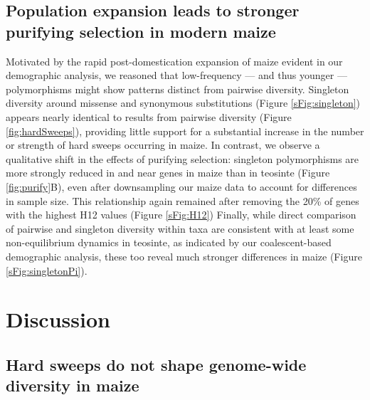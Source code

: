 \documentclass{pnastwo}
\begin{document}
\begin{article}
\subsection{Population expansion leads to stronger purifying selection in modern maize} %
Motivated by the rapid post-domestication expansion of maize evident in our demographic analysis, we reasoned that low-frequency --- and thus younger --- polymorphisms might show patterns distinct from pairwise diversity. 
Singleton diversity around missense and synonymous substitutions (Figure \ref{sFig:singleton}) appears nearly identical to results from pairwise diversity (Figure \ref{fig:hardSweeps}), providing little support for a substantial increase in the number or strength of hard sweeps occurring in maize. 
In contrast, we observe a qualitative shift in the effects of purifying selection: singleton polymorphisms are more strongly reduced in and near genes in maize than in teosinte (Figure \ref{fig:purify}B), even after downsampling our maize data to account for differences in sample size. This relationship again remained after removing the 20\% of genes with the highest H12 values (Figure \ref{sFig:H12})
Finally, while direct comparison of pairwise and singleton diversity within taxa are consistent with at least some non-equilibrium dynamics in teosinte, as indicated by our coalescent-based demographic analysis, these too reveal much stronger differences in maize (Figure \ref{sFig:singletonPi}). 

\section{Discussion}

\subsection{Hard sweeps do not shape genome-wide diversity in maize} %


\end{article}
\end{document}
